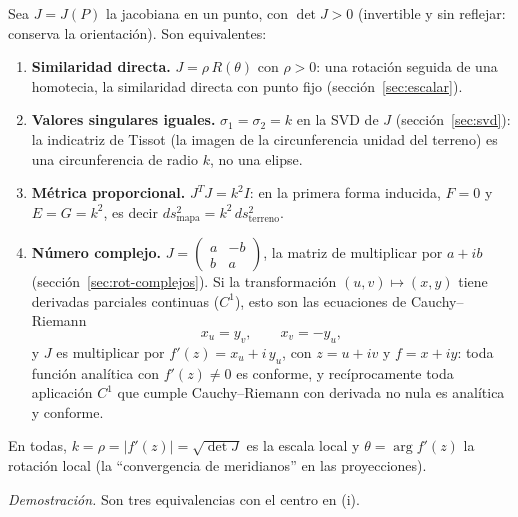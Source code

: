 \begin{resultado}
Sea \(J=J(P)\) la jacobiana en un punto, con \(\det J>0\) (invertible y sin reflejar:
conserva la orientación). Son equivalentes:
\begin{enumerate}[label=(\roman*)]
  \item \textbf{Similaridad directa.} \(J=\rho\,R(\theta)\) con \(\rho>0\): una rotación
  seguida de una homotecia, la similaridad directa con punto fijo
  (sección~\ref{sec:escalar}).
  \item \textbf{Valores singulares iguales.} \(\sigma_1=\sigma_2=k\) en la SVD de \(J\)
  (sección~\ref{sec:svd}): la indicatriz de Tissot (la imagen de la circunferencia unidad
  del terreno) es una circunferencia de radio \(k\), no una elipse.
  \item \textbf{Métrica proporcional.} \(J^TJ=k^2I\): en la primera forma inducida,
  \(F=0\) y \(E=G=k^2\), es decir \(ds^2_{\text{mapa}}=k^2\,ds^2_{\text{terreno}}\).
  \item \textbf{Número complejo.} \(J=\begin{pmatrix}a&-b\\b&a\end{pmatrix}\), la matriz
  de multiplicar por \(a+ib\) (sección~\ref{sec:rot-complejos}). Si la transformación
  \((u,v)\mapsto(x,y)\) tiene derivadas parciales continuas (\(C^1\)), esto son las ecuaciones de Cauchy--Riemann
  \[
    x_u=y_v,\qquad x_v=-y_u ,
  \]
  y \(J\) es multiplicar por \(f'(z)=x_u+i\,y_u\), con \(z=u+iv\) y \(f=x+iy\): toda
  función analítica con \(f'(z)\neq0\) es conforme, y recíprocamente toda aplicación \(C^1\) que cumple Cauchy--Riemann con derivada no nula es analítica y conforme.
\end{enumerate}
En todas, \(k=\rho=|f'(z)|=\sqrt{\det J}\) es la escala local y \(\theta=\arg f'(z)\) la
rotación local (la \enquote{convergencia de meridianos} en las proyecciones).
\end{resultado}

\emph{Demostración.} Son tres equivalencias con el centro en (i).

